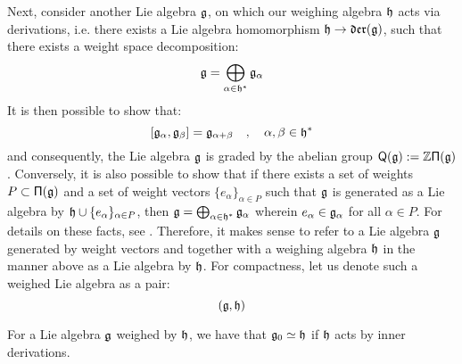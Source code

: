         Next, consider another Lie algebra $\mathfrak{g}$, on which our weighing algebra $\mathfrak{h}$ acts via derivations, i.e. there exists a Lie algebra homomorphism $\mathfrak{h} \to \mathfrak{der}(\mathfrak{g})$, such that there exists a weight space decomposition:
            $$\mathfrak{g} = \bigoplus_{\alpha \in \mathfrak{h}^*} \mathfrak{g}_{\alpha}$$
        It is then possible to show that:
            $$[\mathfrak{g}_{\alpha}, \mathfrak{g}_{\beta}] = \mathfrak{g}_{\alpha + \beta} \quad, \quad \alpha, \beta \in \mathfrak{h}^*$$
        and consequently, the Lie algebra $\mathfrak{g}$ is graded by the abelian group $\mathsf{Q}(\mathfrak{g}) := \mathbb{Z}\mathsf{\Pi}(\mathfrak{g})$. Conversely, it is also possible to show that if there exists a set of weights $P \subset \mathsf{\Pi}(\mathfrak{g})$ and a set of weight vectors $\{ e_{\alpha} \}_{\alpha \in P}$ such that $\mathfrak{g}$ is generated as a Lie algebra by $\mathfrak{h} \cup \{ e_{\alpha} \}_{\alpha \in P}$, then $\mathfrak{g} = \bigoplus_{\alpha \in \mathfrak{h}^*} \mathfrak{g}_{\alpha}$ wherein $e_{\alpha} \in \mathfrak{g}_{\alpha}$ for all $\alpha \in P$. For details on these facts, see \cite[Subsection 2.1, Proposition 2]{moody_pianzola_lie_algebras_with_triangular_decompositions}. Therefore, it makes sense to refer to a Lie algebra $\mathfrak{g}$ generated by weight vectors and together with a weighing algebra $\mathfrak{h}$ in the manner above as a Lie algebra  by $\mathfrak{h}$. For compactness, let us denote such a weighed Lie algebra as a pair:
            $$(\mathfrak{g}, \mathfrak{h})$$
        \begin{remark}
            For a Lie algebra $\mathfrak{g}$ weighed by $\mathfrak{h}$, we have that $\mathfrak{g}_0 \simeq \mathfrak{h}$ if $\mathfrak{h}$ acts by inner derivations.
        \end{remark}

